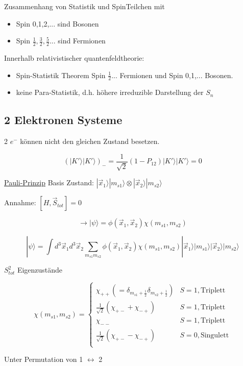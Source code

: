 Zusammenhang von Statistik und SpinTeilchen mit 
\begin{itemize}
\item Spin 0,1,2,... sind Bosonen
\item Spin \(\frac{1}{2},\frac{3}{2},\frac{5}{2}\)... sind Fermionen
\end{itemize}

Innerhalb relativistischer quantenfeldtheorie: 
\begin{itemize}
\item Spin-Statistik Theorem Spin \(\frac{1}{2}\)... Fermionen und Spin 0,1,... Bosonen. 
\item keine Para-Statistik, d.h. höhere irreduzible Darstellung der \(S_n\)
\end{itemize}

\subsection{2 Elektronen Systeme}

2 \(e^-\) können nicht den gleichen Zustand besetzen. 

\[(|K'\rangle |K'\rangle)_- = \frac{1}{\sqrt{2}}(1-P_{12})|K'\rangle |K'\rangle = 0\]

\underline{Pauli-Prinzip}
Basis Zustand: \(|\vec x_1\rangle |m_{s1}\rangle \otimes |\vec x_2\rangle |m_{s2}\rangle\)

Annahme: \([H,\vec S_{tot}]=0\)

\[\rightarrow |\psi\rangle = \phi (\vec x_1,\vec x_2)\chi (m_{s1},m_{s2})\]

\[|\psi\rangle  = \int d^3\vec x_1d^3\vec x_2\sum_{m_{s1}m_{s2}}\phi(\vec x_1,\vec x_2)\chi (m_{s1},m_{s2})|\vec x_1\rangle |m_{s1}\rangle |\vec x_2\rangle |m_{s2}\rangle \]

\(S^2_{tot}\) Eigenzustände

\[\chi(m_{s1},m_{s2})=\begin{cases}
  \chi_{++}(=\delta_{m_{s1}+\frac{1}{2}} \delta_{m_{s2}+\frac{1}{2}}) & S=1,\text{Triplett}\\
  \frac{1}{\sqrt{2}}(\chi_{+-}+\chi_{-+}) & S=1,\text{Triplett}\\
 \chi_{--} & S=1,\text{Triplett} \\
 \frac{1}{\sqrt{2}}(\chi_{+-}-\chi_{-+}) & S=0, \text{Singulett}\\
\end{cases}\]

Unter Permutation von 1 \(\leftrightarrow \) 2

